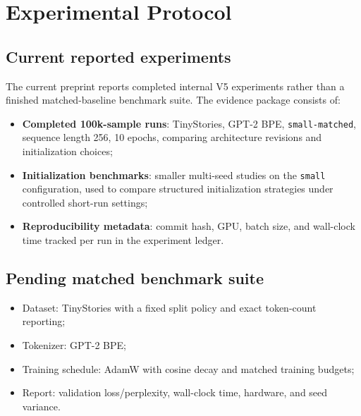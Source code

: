 \documentclass[11pt]{article}
\begin{document}
\section{Experimental Protocol}
\subsection{Current reported experiments}
The current preprint reports completed internal V5 experiments rather than a finished matched-baseline benchmark suite. The evidence package consists of:
\begin{itemize}[leftmargin=1.2em]
  \item \textbf{Completed 100k-sample runs}: TinyStories, GPT-2 BPE, \texttt{small-matched}, sequence length 256, 10 epochs, comparing architecture revisions and initialization choices;
  \item \textbf{Initialization benchmarks}: smaller multi-seed studies on the \texttt{small} configuration, used to compare structured initialization strategies under controlled short-run settings;
  \item \textbf{Reproducibility metadata}: commit hash, GPU, batch size, and wall-clock time tracked per run in the experiment ledger.
\end{itemize}

\subsection{Pending matched benchmark suite}
\begin{itemize}[leftmargin=1.2em]
  \item Dataset: TinyStories with a fixed split policy and exact token-count reporting;
  \item Tokenizer: GPT-2 BPE;
  \item Training schedule: AdamW with cosine decay and matched training budgets;
  \item Report: validation loss/perplexity, wall-clock time, hardware, and seed variance.
\end{itemize}
\end{document}
